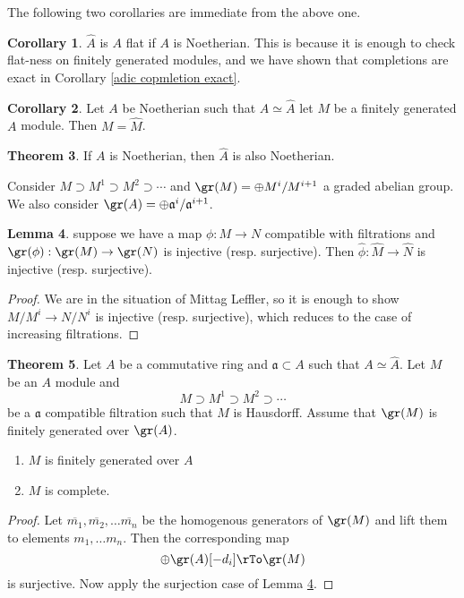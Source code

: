\documentclass[12 pt]{article}
\theoremstyle{definition}
\newtheorem{theorem}{Theorem}[section]
\newtheorem{corollary}[theorem]{Corollary}
\newtheorem{lemma}[theorem]{Lemma}
\newcommand\fa{{\mathfrak a}}
\begin{document}
The following two corollaries are immediate from the above one.

\begin{corollary}  $\hat{A}$ is $A$ flat if $A$ is Noetherian. This is because it is enough to check flat-ness on finitely generated modules, and we have shown that completions are exact in Corollary \ref{adic copmletion exact}.
\end{corollary}


\begin{corollary} Let $A$ be Noetherian such that $A \simeq \hat{A}$ let $M$ be a finitely generated $A$ module. Then $M=\hat{M}$.
\end{corollary}


\begin{theorem} If $A$ is Noetherian, then $\hat{A}$ is also Noetherian.
\end{theorem}

Consider $M \supset M^1 \supset M^2 \supset \cdots$ and $\gr(M)=\oplus M^i/M^{i+1}$ a graded abelian group. We also consider $\gr(A)=\oplus \fa^i/\fa^{i+1}$.

\begin{lemma} suppose we have a map $\phi:M \to N$ compatible with filtrations and $\gr(\phi):\gr(M) \to \gr(N)$ is injective (resp. surjective). Then $\hat{\phi}:\hat{M} \to \hat{N}$ is injective (resp. surjective).
\label{gr to completion surj/inj}
\end{lemma}
\begin{proof} We are in the situation of Mittag Leffler, so it is enough to show $M/M^i \to N/N^i$ is injective (resp. surjective), which reduces to the case of increasing filtrations.
\end{proof}

\begin{theorem} Let $A$ be a commutative ring and $\fa \subset A$ such that $A \simeq \hat{A}$. Let $M$ be an $A$ module and
\[M \supset M^1 \supset M^2 \supset \cdots\]
be a $\fa$ compatible filtration such that $M$ is Hausdorff. Assume that $\gr(M)$ is finitely generated over $\gr(A)$.
\begin{enumerate}
\item $M$ is finitely generated over $A$

\item $M$ is complete.
\end{enumerate}
\end{theorem}

\begin{proof} Let $\overline{m_1}, \overline{m_2}, \ldots \overline{m_n}$ be the homogenous generators of $\gr(M)$ and lift them to elements $m_1, \ldots m_n$. Then the corresponding map
\[\oplus \gr(A)[-d_i] \rTo \gr(M)\]
is surjective. Now apply the surjection case of Lemma \ref{gr to completion surj/inj}.
\end{proof}
\end{document}
